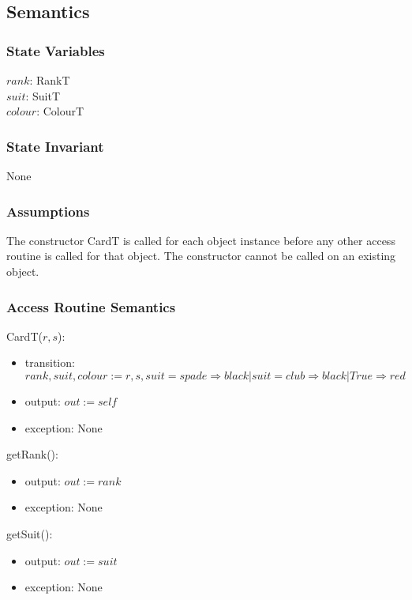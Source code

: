 \documentclass[12pt]{article}
\begin{document}
\subsection* {Semantics}

\subsubsection* {State Variables}

$rank$: RankT\\ 
$suit$: SuitT\\
$colour$: ColourT

\subsubsection* {State Invariant}

None

\subsubsection* {Assumptions}

The constructor CardT is called for each object instance before any other
access routine is called for that object.  The constructor cannot be called on
an existing object.

\subsubsection* {Access Routine Semantics}

CardT($r, s$):
\begin{itemize}
\item transition: $rank, suit, colour:= r, s, suit = spade \Rightarrow black | suit = club \Rightarrow black | True \Rightarrow red$
\item output: $out := \mathit{self}$
\item exception: None
\end{itemize}

\noindent getRank():
\begin{itemize}
\item output: $out := rank$
\item exception: None
\end{itemize}

\noindent getSuit():
\begin{itemize}
\item output: $out := suit$
\item exception: None
\end{itemize}
\end{document}
